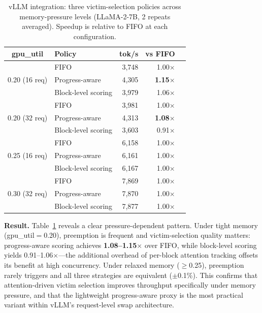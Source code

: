 \documentclass[conference]{IEEEtran}
\begin{document}
\begin{table}[t]
\centering
\caption{vLLM integration: three victim-selection policies across memory-pressure levels (LLaMA-2-7B, 2 repeats averaged). Speedup is relative to FIFO at each configuration.}
\label{tab:vllm-block}
\small
\begin{tabular}{@{}clrrr@{}}
\toprule
gpu\_util & Policy & tok/s & vs FIFO \\
\midrule
\multirow{3}{*}{0.20 (16 req)}
  & FIFO              & 3{,}748 & 1.00$\times$ \\
  & Progress-aware     & 4{,}305 & \textbf{1.15$\times$} \\
  & Block-level scoring & 3{,}979 & 1.06$\times$ \\
\midrule
\multirow{3}{*}{0.20 (32 req)}
  & FIFO              & 3{,}981 & 1.00$\times$ \\
  & Progress-aware     & 4{,}313 & \textbf{1.08$\times$} \\
  & Block-level scoring & 3{,}603 & 0.91$\times$ \\
\midrule
\multirow{3}{*}{0.25 (16 req)}
  & FIFO              & 6{,}158 & 1.00$\times$ \\
  & Progress-aware     & 6{,}161 & 1.00$\times$ \\
  & Block-level scoring & 6{,}167 & 1.00$\times$ \\
\midrule
\multirow{3}{*}{0.30 (32 req)}
  & FIFO              & 7{,}869 & 1.00$\times$ \\
  & Progress-aware     & 7{,}870 & 1.00$\times$ \\
  & Block-level scoring & 7{,}877 & 1.00$\times$ \\
\bottomrule
\end{tabular}
\end{table}

\textbf{Result.} Table~\ref{tab:vllm-block} reveals a clear pressure-dependent pattern. Under tight memory (gpu\_util$=$0.20), preemption is frequent and victim-selection quality matters: progress-aware scoring achieves \textbf{1.08--1.15$\times$} over FIFO, while block-level scoring yields 0.91--1.06$\times$---the additional overhead of per-block attention tracking offsets its benefit at high concurrency. Under relaxed memory ($\geq$0.25), preemption rarely triggers and all three strategies are equivalent ($\pm$0.1\%). This confirms that attention-driven victim selection improves throughput specifically under memory pressure, and that the lightweight progress-aware proxy is the most practical variant within vLLM's request-level swap architecture.
\end{document}
